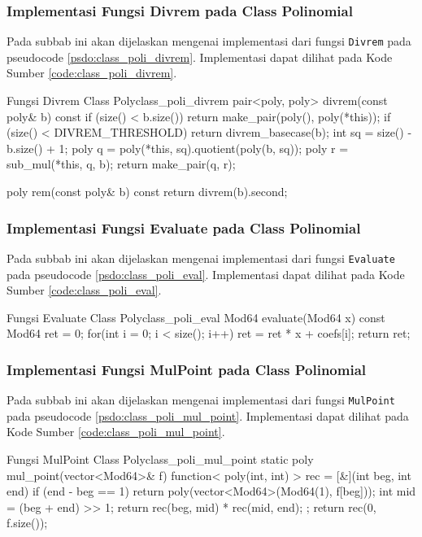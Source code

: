 \subsubsection{Implementasi Fungsi Divrem pada Class Polinomial}
Pada subbab ini akan dijelaskan mengenai implementasi dari fungsi \texttt{Divrem} pada pseudocode \ref{psdo:class_poli_divrem}. Implementasi dapat dilihat pada Kode Sumber \ref{code:class_poli_divrem}.


\begin{code}[firstnumber=1]{Fungsi Divrem Class Poly}{class_poli_divrem}
	pair<poly, poly> divrem(const poly& b) const {
		if (size() < b.size()) return make_pair(poly(), poly(*this));
		if (size() < DIVREM_THRESHOLD) {
			return divrem_basecase(b);
		}
		int sq = size() - b.size() + 1;
		poly q = poly(*this, sq).quotient(poly(b, sq));
		poly r = sub_mul(*this, q, b);
		return make_pair(q, r);
	}

	poly rem(const poly& b) const {
		return divrem(b).second;
	}
\end{code}

\subsubsection{Implementasi Fungsi Evaluate pada Class Polinomial}
Pada subbab ini akan dijelaskan mengenai implementasi dari fungsi \texttt{Evaluate} pada pseudocode \ref{psdo:class_poli_eval}. Implementasi dapat dilihat pada Kode Sumber \ref{code:class_poli_eval}.


\begin{code}[firstnumber=1]{Fungsi Evaluate Class Poly}{class_poli_eval}
	Mod64 evaluate(Mod64 x) const {
		Mod64 ret = 0;
		for(int i = 0; i < size(); i++){
			ret = ret * x + coefs[i];
		}
		return ret;
	}
\end{code}

\subsubsection{Implementasi Fungsi MulPoint pada Class Polinomial}
Pada subbab ini akan dijelaskan mengenai implementasi dari fungsi \texttt{MulPoint} pada pseudocode \ref{psdo:class_poli_mul_point}. Implementasi dapat dilihat pada Kode Sumber \ref{code:class_poli_mul_point}.


\begin{code}[firstnumber=1]{Fungsi MulPoint Class Poly}{class_poli_mul_point}
	static poly mul_point(vector<Mod64>& f){
		function< poly(int, int) > rec = [&](int beg, int end) {
			if (end - beg == 1) {
				return poly(vector<Mod64>({Mod64(1), f[beg]}));
			}
			int mid = (beg + end) >> 1;
			return rec(beg, mid) * rec(mid, end);
		};
		return rec(0, f.size());
	}
\end{code}

